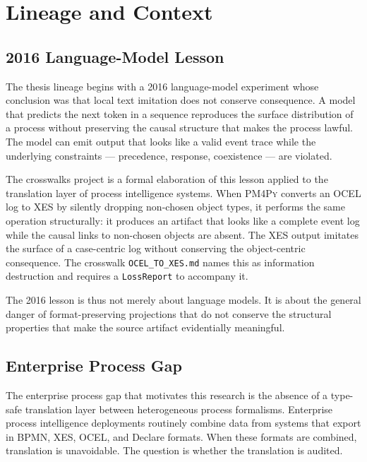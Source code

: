 
\section{Lineage and Context}
\label{sec:crosswalks-lineage}

\subsection{2016 Language-Model Lesson}
\label{sec:crosswalks-lineage-2016}

The thesis lineage begins with a 2016 language-model experiment whose conclusion was that local
text imitation does not conserve consequence. A model that predicts the next token in a sequence
reproduces the surface distribution of a process without preserving the causal structure that
makes the process lawful. The model can emit output that looks like a valid event trace while
the underlying constraints --- precedence, response, coexistence --- are violated.

The crosswalks project is a formal elaboration of this lesson applied to the translation layer
of process intelligence systems. When \textsc{PM4Py} converts an \textsc{OCEL} log to \textsc{XES}
by silently dropping non-chosen object types, it performs the same operation structurally: it
produces an artifact that looks like a complete event log while the causal links to non-chosen
objects are absent. The \textsc{XES} output imitates the surface of a case-centric log without
conserving the object-centric consequence. The crosswalk \texttt{OCEL\_TO\_XES.md} names this
as information destruction and requires a \texttt{LossReport} to accompany it.

The 2016 lesson is thus not merely about language models. It is about the general danger of
format-preserving projections that do not conserve the structural properties that make the source
artifact evidentially meaningful.

\subsection{Enterprise Process Gap}
\label{sec:crosswalks-lineage-enterprise}

The enterprise process gap that motivates this research is the absence of a type-safe translation
layer between heterogeneous process formalisms. Enterprise process intelligence deployments
routinely combine data from systems that export in \textsc{BPMN}, \textsc{XES}, \textsc{OCEL},
and Declare formats. When these formats are combined, translation is unavoidable. The question is
whether the translation is audited.


